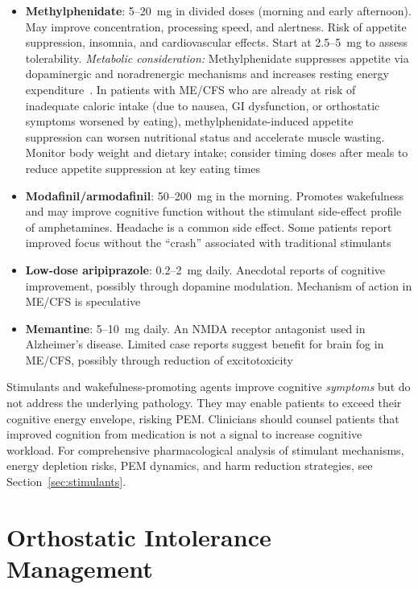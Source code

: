 \begin{itemize}
    \item \textbf{Methylphenidate}: 5--20~mg in divided doses (morning and early afternoon). May improve concentration, processing speed, and alertness. Risk of appetite suppression, insomnia, and cardiovascular effects. Start at 2.5--5~mg to assess tolerability. \emph{Metabolic consideration:} Methylphenidate suppresses appetite via dopaminergic and noradrenergic mechanisms and increases resting energy expenditure~\cite{Lorello2008methylphenidate}. In patients with ME/CFS who are already at risk of inadequate caloric intake (due to nausea, GI dysfunction, or orthostatic symptoms worsened by eating), methylphenidate-induced appetite suppression can worsen nutritional status and accelerate muscle wasting. Monitor body weight and dietary intake; consider timing doses after meals to reduce appetite suppression at key eating times
    \item \textbf{Modafinil/armodafinil}: 50--200~mg in the morning. Promotes wakefulness and may improve cognitive function without the stimulant side-effect profile of amphetamines. Headache is a common side effect. Some patients report improved focus without the ``crash'' associated with traditional stimulants
    \item \textbf{Low-dose aripiprazole}: 0.2--2~mg daily. Anecdotal reports of cognitive improvement, possibly through dopamine modulation. Mechanism of action in ME/CFS is speculative
    \item \textbf{Memantine}: 5--10~mg daily. An NMDA receptor antagonist used in Alzheimer's disease. Limited case reports suggest benefit for brain fog in ME/CFS, possibly through reduction of excitotoxicity
\end{itemize}

\begin{limitation}
Stimulants and wakefulness-promoting agents improve cognitive \textit{symptoms} but do not address the underlying pathology. They may enable patients to exceed their cognitive energy envelope, risking PEM. Clinicians should counsel patients that improved cognition from medication is not a signal to increase cognitive workload. For comprehensive pharmacological analysis of stimulant mechanisms, energy depletion risks, PEM dynamics, and harm reduction strategies, see Section~\ref{sec:stimulants}.
\end{limitation}

\section{Orthostatic Intolerance Management}
\label{sec:orthostatic-management}

